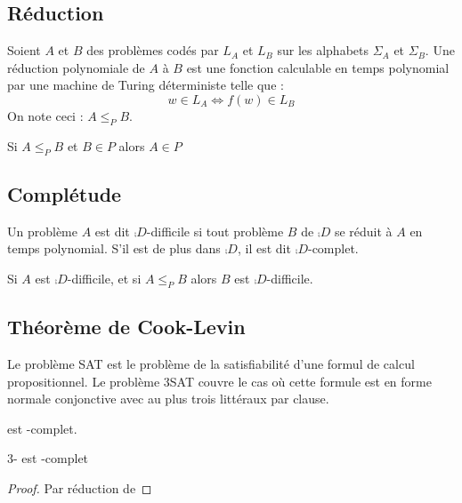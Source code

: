 \documentclass{cours}
\begin{document}
\subsection{Réduction}
\begin{definition}
    Soient $A$ et $B$ des problèmes codés par $L_{A}$ et $L_{B}$ sur les alphabets $\Sigma_{A}$ et $\Sigma_{B}$. Une réduction polynomiale de $A$ à $B$ est une fonction calculable en temps polynomial par une machine de Turing déterministe telle que : 
    \[
        w \in L_{A} \Leftrightarrow f(w) \in L_{B}
    \]
    On note ceci : $A \leq_{P} B$.
\end{definition}

\begin{proposition}
    Si $A \leq_{P} B$ et $B \in P$ alors $A\in P$ 
\end{proposition}

\subsection{Complétude}
\begin{definition}
    Un problème $A$ est dit $\comp{D}$-difficile si tout problème $B$ de $\comp{D}$ se réduit à $A$ en temps polynomial. S'il est de plus dans $\comp{D}$, il est dit $\comp{D}$-complet.
\end{definition}

\begin{proposition}
    Si $A$ est $\comp{D}$-difficile, et si $A \leq_{P} B$ alors $B$ est $\comp{D}$-difficile. 
\end{proposition}


\subsection{Théorème de Cook-Levin}
\begin{definition}
    Le problème SAT est le problème de la satisfiabilité d'une formul de calcul propositionnel. Le problème 3SAT couvre le cas où cette formule est en forme normale conjonctive avec au plus trois littéraux par clause. 
\end{definition}

\begin{theorem}\label{thm:cook}
     est -complet. 
\end{theorem}

\begin{theorem}
    $3$- est -complet
\end{theorem}
\begin{proof}
    Par réduction de 
\end{proof}
\end{document}
